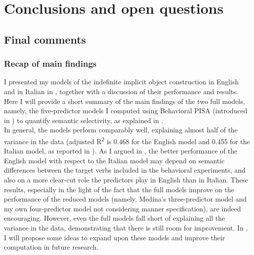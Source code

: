 \setchapterpreamble[u]{\margintoc}
\chapter{Conclusions and open questions}

\section{Final comments} 

\subsection{Recap of main findings}

I presented my models of the indefinite implicit object construction in English and in Italian in , together with a discussion of their performance and results. Here I will provide a short summary of the main findings of the two full models, namely, the five-predictor models I computed using Behavioral PISA (introduced in ) to quantify semantic selectivity, as explained in .\\
In general, the models perform comparably well, explaining almost half of the variance in the data (adjusted R\textsuperscript{2} is 0.468 for the English model and 0.455 for the Italian model, as reported in ). As I argued in , the better performance of the English model with respect to the Italian model may depend on semantic differences between the target verbs included in the behavioral experiments, and also on a more clear-cut role the predictors play in English than in Italian. These results, especially in the light of the fact that the full models improve on the performance of the reduced models (namely, Medina's three-predictor model and my own four-predictor model not considering manner specification), are indeed encouraging. However, even the full models fall short of explaining all the variance in the data, demonstrating that there is still room for improvement. In , I will propose some ideas to expand upon these models and improve their computation in future research.\\
